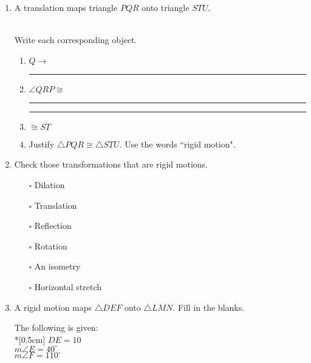 \documentclass[12pt, twoside]{article}
\begin{document}
\begin{enumerate}
  \item A translation maps triangle $PQR$ onto triangle $STU$. \vspace{0.5cm}
    \begin{multicols}{2}
      \\
      Write each corresponding object.
      \begin{enumerate}
        \item $Q \rightarrow$ \rule{2cm}{0.15mm}
        \item $\angle QRP \cong$ \rule{2cm}{0.15mm}
        \item \rule{2cm}{0.15mm} $\cong \overline {ST}$
        \item Justify $\triangle PQR \cong \triangle STU$. Use the words ``rigid motion".
      \end{enumerate}
    \end{multicols}  \vspace{2cm}

    \item Check those transformations that are rigid motions.
    \begin{itemize}
      \item[$\square$] Dilation
      \item[$\square$] Translation
      \item[$\square$] Reflection
      \item[$\square$] Rotation
      \item[$\square$] An isometry
      \item[$\square$] Horizontal stretch
    \end{itemize}

  \item A rigid motion maps $\triangle DEF$ onto $\triangle LMN$. Fill in the blanks. \vspace{0.5cm}
  \begin{multicols}{2}
    The following is given:\\*[0.5cm]
      $DE=10$ \\
      $m\angle E = 40^\circ$ \\
      $m\angle F = 110^\circ$ \\[0.5cm]
      \columnbreak
      

\end{multicols}
\end{enumerate}
\end{document}
